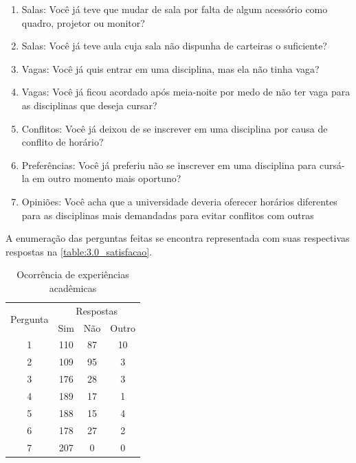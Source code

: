 \begin{enumerate}
  \item Salas: Você já teve que mudar de sala por falta de algum acessório como quadro, projetor ou monitor? %
  \item Salas: Você já teve aula cuja sala não dispunha de carteiras o suficiente? %
  \item Vagas: Você já quis entrar em uma disciplina, mas ela não tinha vaga? %
  \item Vagas: Você já ficou acordado após meia-noite por medo de não ter vaga para as disciplinas que deseja cursar? %
  \item Conflitos: Você já deixou de se inscrever em uma disciplina por causa de conflito de horário? %
  \item Preferências: Você já preferiu não se inscrever em uma disciplina para cursá-la em outro momento mais oportuno? %
  \item Opiniões: Você acha que a universidade deveria oferecer horários diferentes para as disciplinas mais demandadas para evitar conflitos com outras  %
\end{enumerate}

A enumeração das perguntas feitas se encontra representada com suas respectivas respostas na \autoref{table:3.0_satisfacao}.

\begin{table}[htbp]\centering
  \caption{Ocorrência de experiências acadêmicas}
  \label{table:3.0_satisfacao}
  \begin{tabular}{| c | c c c |}
    \hline
    \multicolumn{1}{|c|}{\multirow{2}{*}{Pergunta}} & \multicolumn{3}{c|}{Respostas}
    \\
    \multicolumn{1}{|c|}{}                          &
    Sim                                             &
    \multicolumn{1}{|c|}{Não}                       &
    Outro
    \\
    \hline
    1                                               & 110                            & 87 & 10 \\ %
    2                                               & 109                            & 95 & 3  \\ %
    3                                               & 176                            & 28 & 3  \\ %
    4                                               & 189                            & 17 & 1  \\ %
    5                                               & 188                            & 15 & 4  \\ %
    6                                               & 178                            & 27 & 2  \\ %
    7                                               & 207                            & 0  & 0  \\ %
    \hline
  \end{tabular}
\end{table}

